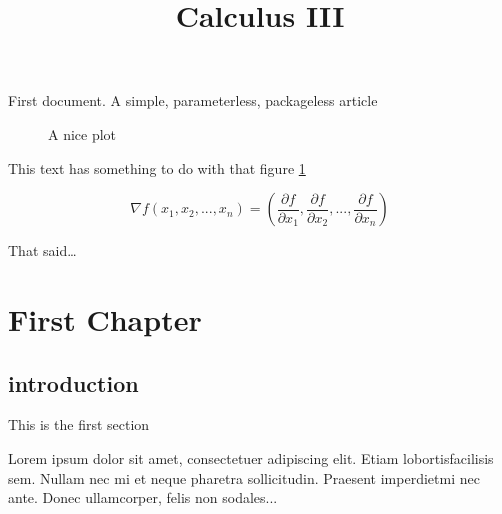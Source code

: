\documentclass[12pt, letterpaper]{article}
\title{Calculus III}
\date{} %
\begin{document}
    \maketitle

    First document. A simple, parameterless, packageless article

    \begin{figure}[h]
        \centering
        \caption{A nice plot}
        \label{fig:mesh1}
    \end{figure}

    This text has something to do with that figure \ref{fig:mesh1}

    \begin{displaymath}
        \nabla f(x_1, x_2, ..., x_n) = \left(\frac{\partial f}{\partial x_1}, \frac{\partial f}{\partial x_2}, ..., \frac{\partial f}{\partial x_n}\right)
    \end{displaymath}

    That said\dots

    \chapter{First Chapter}

    \section{introduction}

    This is the first section

    Lorem  ipsum  dolor  sit  amet,  consectetuer  adipiscing  
elit.   Etiam  lobortisfacilisis sem.  Nullam nec mi et 
neque pharetra sollicitudin.  Praesent imperdietmi nec ante. 
Donec ullamcorper, felis non sodales...
    
\end{document}
